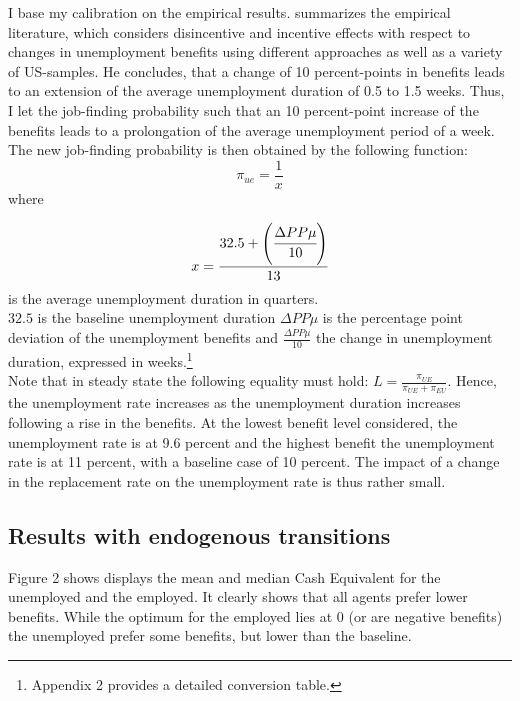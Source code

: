 \documentclass[a4paper,12pt]{article}
\begin{document}
I base my calibration on the empirical results. \citep{decker} summarizes the empirical literature, which considers disincentive and incentive effects with respect to changes in unemployment benefits using different approaches as well as a variety of US-samples. He concludes, that a change of 10 percent-points in benefits leads to an extension of the average unemployment duration of 0.5 to 1.5 weeks. 
Thus, I let the job-finding probability such that an 10 percent-point increase of the benefits leads to a prolongation of the average unemployment period of a week. The new job-finding probability is then obtained by the following function:
\begin{equation}
	\pi_{ue}=\frac{1}{x} \nonumber
\end{equation}
where 

\begin{equation}
	x=\cfrac{32.5+\left(\cfrac{\Delta PP \mu}{10}\right)}{13} \nonumber
\end{equation}
is the average unemployment duration in quarters. \\

$32.5$ is the baseline unemployment duration $\Delta PP \mu$ is the percentage point deviation of the unemployment benefits and $\frac{\Delta PP \mu}{10}$ the change in unemployment duration, expressed in weeks.\footnote{Appendix 2 provides a detailed conversion table.} \\
Note that in steady state the following equality must hold: $ L = \frac{\pi_{UE}}{\pi_{UE}+\pi_{EU}}$.
Hence, the unemployment rate increases as the unemployment duration increases following a rise in the benefits. At the lowest benefit level considered, the unemployment rate is at 9.6 percent and the highest benefit the unemployment rate is at 11 percent, with a baseline case of 10 percent. The impact of a change in the replacement rate on the unemployment rate is thus rather small. 

\subsection{Results with endogenous transitions}


Figure 2 shows displays the mean and median Cash Equivalent for the unemployed and the employed. It clearly shows that all agents prefer lower benefits. While the optimum for the employed lies at 0 (or are negative benefits) the unemployed prefer some benefits, but lower than the baseline. 
\end{document}
